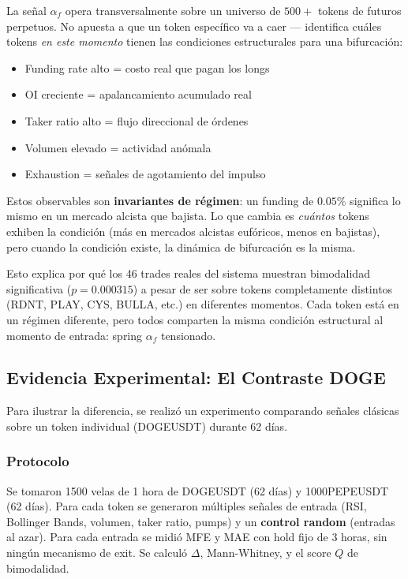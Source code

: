 \documentclass[11pt,a4paper]{article}
\newcommand{\af}{\alpha_f}
\begin{document}
La se\~nal $\af$ opera transversalmente sobre un universo de $500+$
tokens de futuros perpetuos. No apuesta a que un token espec\'ifico
va a caer --- identifica cu\'ales tokens \textit{en este momento}
tienen las condiciones estructurales para una bifurcaci\'on:

\begin{itemize}[leftmargin=1.5em]
\item Funding rate alto = costo real que pagan los longs
\item OI creciente = apalancamiento acumulado real
\item Taker ratio alto = flujo direccional de \'ordenes
\item Volumen elevado = actividad an\'omala
\item Exhaustion = se\~nales de agotamiento del impulso
\end{itemize}

Estos observables son \textbf{invariantes de r\'egimen}: un funding
de $0.05\%$ significa lo mismo en un mercado alcista que bajista.
Lo que cambia es \textit{cu\'antos} tokens exhiben la condici\'on
(m\'as en mercados alcistas euf\'oricos, menos en bajistas), pero
cuando la condici\'on existe, la din\'amica de bifurcaci\'on es la misma.

Esto explica por qu\'e los 46 trades reales del sistema muestran
bimodalidad significativa ($p = 0.000315$) a pesar de ser sobre
tokens completamente distintos (RDNT, PLAY, CYS, BULLA, etc.) en
diferentes momentos. Cada token est\'a en un r\'egimen diferente,
pero todos comparten la misma condici\'on estructural al momento
de entrada: spring $\af$ tensionado.


\subsection{Evidencia Experimental: El Contraste DOGE}

Para ilustrar la diferencia, se realiz\'o un experimento comparando
se\~nales cl\'asicas sobre un token individual (DOGEUSDT) durante
62 d\'ias.

\subsubsection{Protocolo}

Se tomaron 1500 velas de 1 hora de DOGEUSDT (62 d\'ias) y 1000PEPEUSDT
(62 d\'ias). Para cada token se generaron m\'ultiples se\~nales de
entrada (RSI, Bollinger Bands, volumen, taker ratio, pumps) y un
\textbf{control random} (entradas al azar). Para cada entrada se
midi\'o MFE y MAE con hold fijo de 3 horas, sin ning\'un mecanismo
de exit. Se calcul\'o $\Delta$, Mann-Whitney, y el score $Q$ de
bimodalidad.
\end{document}

